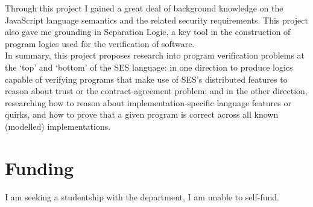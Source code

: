 \documentclass[a4paper]{article}
\begin{document}
Through this project I gained a great deal of background knowledge on the
JavaScript language semantics and the related security requirements. This
project also gave me grounding in Separation Logic, a key tool in
the construction of program logics used for the verification of software.
\\

In summary, this project proposes research into program verification problems at
the `top' and `bottom' of the SES language: in one direction to produce logics
capable of verifying programs that make use of SES's distributed features to
reason about trust or the contract-agreement problem; and in the other direction,
researching how to reason about implementation-specific language features or
quirks, and how to prove that a given program is correct across all known
(modelled) implementations.

\section{Funding}
I am seeking a studentship with the department, I am unable to self-fund.
\end{document}
